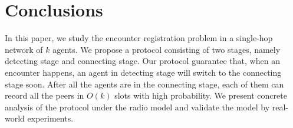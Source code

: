 \section{Conclusions}
\label{sectionconclusion}

In this paper, we study the encounter registration problem in a single-hop network of $k$ 
agents. We propose a protocol consisting of two stages, namely detecting stage and 
connecting stage. Our protocol guarantee that, when an encounter happens, 
an agent in detecting stage will switch 
to the connecting stage soon. After all the agents are in the connecting stage,  
each of them can record all the peers in $O(k)$ slots with high probability.
We present concrete analysis of the protocol under the radio model and validate the model 
by real-world experiments. 